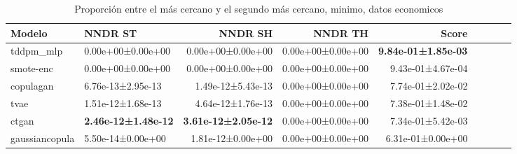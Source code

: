 \begin{table}[H]
\centering
\fontsize{10}{14}\selectfont
\caption{Proporción entre el más cercano y el segundo más cercano, minimo, datos economicos}
\label{table-dcr-economicos-b}
\begin{tabular}{|l|l|r|r|r|r|r|r|r|}
\hline
\rowcolor[gray]{0.8}
Modelo & NNDR ST & NNDR SH & NNDR TH & \textbf{Score} \\
\hline tddpm\_mlp & \cellcolor[rgb]{0.9, 0.54, 0.52} 0.00e+00±0.00e+00 & \cellcolor[rgb]{0.9, 0.54, 0.52} 0.00e+00±0.00e+00 & 0.00e+00±0.00e+00 & \bfseries 9.84e-01±1.85e-03 \\
\hline smote-enc & \cellcolor[rgb]{0.9, 0.54, 0.52} 0.00e+00±0.00e+00 & \cellcolor[rgb]{0.9, 0.54, 0.52} 0.00e+00±0.00e+00 & 0.00e+00±0.00e+00 & 9.43e-01±4.67e-04 \\
\hline copulagan & 6.76e-13±2.95e-13 & 1.49e-12±5.43e-13 & 0.00e+00±0.00e+00 & 7.74e-01±2.02e-02 \\
\hline tvae & 1.51e-12±1.68e-13 & 4.64e-12±1.76e-13 & 0.00e+00±0.00e+00 & 7.38e-01±1.48e-02 \\
\hline ctgan & \bfseries 2.46e-12±1.48e-12 & \bfseries 3.61e-12±2.05e-12 & 0.00e+00±0.00e+00 & 7.34e-01±5.42e-03 \\
\hline gaussiancopula & 5.50e-14±0.00e+00 & 1.81e-12±0.00e+00 & 0.00e+00±0.00e+00 & \cellcolor[rgb]{0.9, 0.54, 0.52} 6.31e-01±0.00e+00 \\
\hline
\end{tabular}
\end{table}
